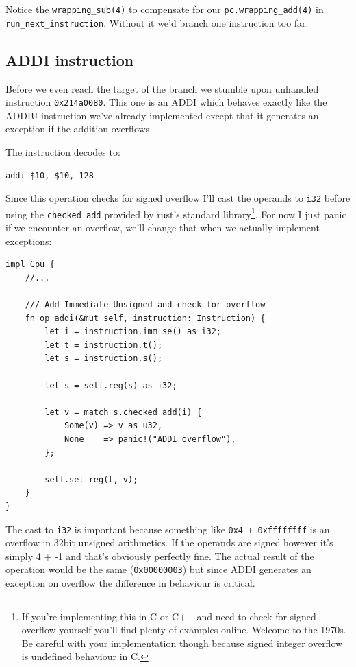 \documentclass[a4paper]{article}
\newcommand{\code}[1] {\texttt{#1}}
\begin{document}
Notice the \code{wrapping\_sub(4)} to compensate for our
\code{pc.wrapping\_add(4)} in
\code{run\_next\_instruction}. Without it we'd branch one
instruction too far.

\subsection{ADDI instruction}

Before we even reach the target of the branch we stumble upon
unhandled instruction \code{0x214a0080}. This one is an ADDI which
behaves exactly like the ADDIU instruction we've already implemented
except that it generates an exception if the addition overflows.

The instruction decodes to:
\begin{lstlisting}[language=assembly]
addi $10, $10, 128
\end{lstlisting}

Since this operation checks for signed overflow I'll cast the operands
to \code{i32} before using the \code{checked\_add} provided by
rust's standard library\footnote{If you're implementing this in C or
  C++ and need to check for signed overflow yourself you'll find
  plenty of examples online. Welcome to the 1970s. Be careful with
  your implementation though because signed integer overflow is
  undefined behaviour in C.}. For now I just panic if we encounter an
  overflow, we'll change that when we actually implement exceptions:

\begin{lstlisting}
impl Cpu {
    //...

    /// Add Immediate Unsigned and check for overflow
    fn op_addi(&mut self, instruction: Instruction) {
        let i = instruction.imm_se() as i32;
        let t = instruction.t();
        let s = instruction.s();

        let s = self.reg(s) as i32;

        let v = match s.checked_add(i) {
            Some(v) => v as u32,
            None    => panic!("ADDI overflow"),
        };

        self.set_reg(t, v);
    }
}
\end{lstlisting}

The cast to \code{i32} is important because something like
\code{0x4 + 0xffffffff} is an overflow in 32bit unsigned
arithmetics. If the operands are signed however it's simply 4 + -1 and
that's obviously perfectly fine. The actual result of the operation
would be the same (\code{0x00000003}) but since ADDI generates an
exception on overflow the difference in behaviour is critical.
\end{document}
